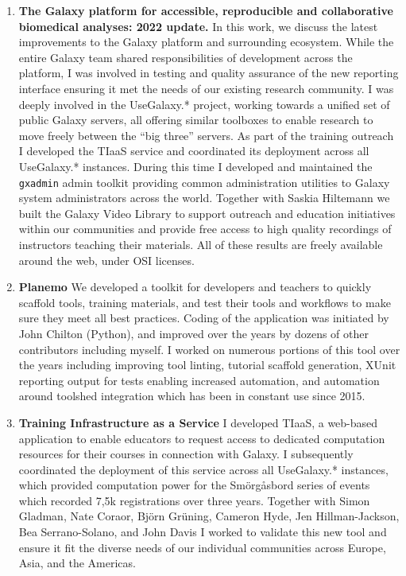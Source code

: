 \begin{enumerate}[label=\ref{chapter:platform}.\arabic*]
\itemsep-0.5em
\setcounter{enumi}{-1}
\item \textbf{The Galaxy platform for accessible, reproducible and collaborative biomedical analyses: 2022 update.} In this work, we discuss the latest improvements to the Galaxy platform and surrounding ecosystem. While the entire Galaxy team shared responsibilities of development across the platform, I was involved in testing and quality assurance of the new reporting interface ensuring it met the needs of our existing research community. I was deeply involved in the UseGalaxy.* project, working towards a unified set of public Galaxy servers, all offering similar toolboxes to enable research to move freely between the ``big three'' servers. As part of the training outreach I developed the TIaaS service and coordinated its deployment across all UseGalaxy.* instances. During this time I developed and maintained the \texttt{gxadmin} admin toolkit providing common administration utilities to Galaxy system administrators across the world. Together with Saskia Hiltemann we built the Galaxy Video Library to support outreach and education initiatives within our communities and provide free access to high quality recordings of instructors teaching their materials. All of these results are freely available around the web, under OSI licenses.
\item \textbf{Planemo} We developed a toolkit for developers and teachers to quickly scaffold tools, training materials, and test their tools and workflows to make sure they meet all best practices. Coding of the application was initiated by John Chilton (Python), and improved over the years by dozens of other contributors including myself. I worked on numerous portions of this tool over the years including improving tool linting, tutorial scaffold generation, XUnit reporting output for tests enabling increased automation, and automation around toolshed integration which has been in constant use since 2015.
\item \textbf{Training Infrastructure as a Service} I developed TIaaS, a web-based application to enable educators to request access to dedicated computation resources for their courses in connection with Galaxy. I subsequently coordinated the deployment of this service across all UseGalaxy.* instances, which provided computation power for the Smörgåsbord series of events which recorded 7,5k registrations over three years. Together with Simon Gladman, Nate Coraor, Björn Grüning, Cameron Hyde, Jen Hillman-Jackson, Bea Serrano-Solano, and John Davis I worked to validate this new tool and ensure it fit the diverse needs of our individual communities across Europe, Asia, and the Americas.
\end{enumerate}


